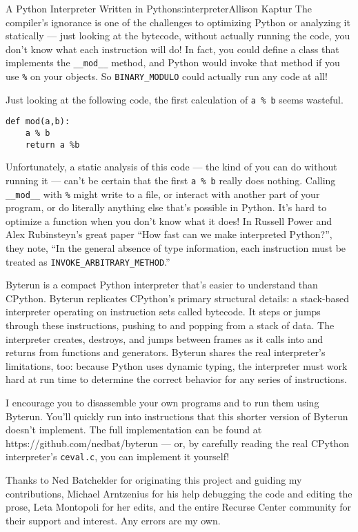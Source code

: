 \begin{aosachapter}{A Python Interpreter Written in Python}{s:interpreter}{Allison Kaptur}
The compiler's ignorance is one of the challenges to optimizing Python
or analyzing it statically --- just looking at the bytecode, without
actually running the code, you don't know what each instruction will do!
In fact, you could define a class that implements the
\texttt{\_\_mod\_\_} method, and Python would invoke that method if you
use \texttt{\%} on your objects. So \texttt{BINARY\_MODULO} could
actually run any code at all!

Just looking at the following code, the first calculation of
\texttt{a \% b} seems wasteful.

\begin{verbatim}
def mod(a,b):
    a % b
    return a %b
\end{verbatim}

Unfortunately, a static analysis of this code --- the kind of you can do
without running it --- can't be certain that the first \texttt{a \% b}
really does nothing. Calling \texttt{\_\_mod\_\_} with \texttt{\%} might
write to a file, or interact with another part of your program, or do
literally anything else that's possible in Python. It's hard to optimize
a function when you don't know what it does! In Russell Power and Alex
Rubinsteyn's great paper ``How fast can we make interpreted Python?'',
they note, ``In the general absence of type information, each
instruction must be treated as \texttt{INVOKE\_ARBITRARY\_METHOD}.''

\label{conclusion}

Byterun is a compact Python interpreter that's easier to understand than
CPython. Byterun replicates CPython's primary structural details: a
stack-based interpreter operating on instruction sets called bytecode.
It steps or jumps through these instructions, pushing to and popping
from a stack of data. The interpreter creates, destroys, and jumps
between frames as it calls into and returns from functions and
generators. Byterun shares the real interpreter's limitations, too:
because Python uses dynamic typing, the interpreter must work hard at
run time to determine the correct behavior for any series of
instructions.

I encourage you to disassemble your own programs and to run them using
Byterun. You'll quickly run into instructions that this shorter version
of Byterun doesn't implement. The full implementation can be found at
https://github.com/nedbat/byterun --- or, by carefully reading the real
CPython interpreter's \texttt{ceval.c}, you can implement it yourself!

\label{acknowledgements}

Thanks to Ned Batchelder for originating this project and guiding my
contributions, Michael Arntzenius for his help debugging the code and
editing the prose, Leta Montopoli for her edits, and the entire Recurse
Center community for their support and interest. Any errors are my own.

\end{aosachapter}
